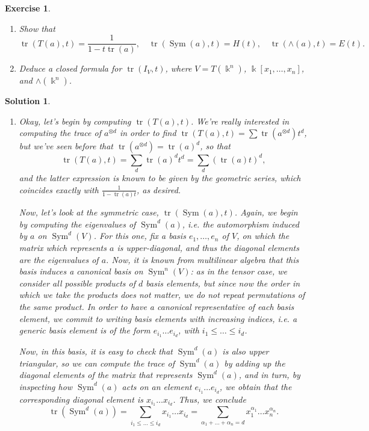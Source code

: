 \documentclass{article}
\newtheorem{ex}{Exercise}
\theoremstyle{nonumberplain}
\newtheorem{sol}{Solution}
\newcommand{\kk}{\Bbbk}
\DeclareMathOperator{\trace}{tr}
\DeclareMathOperator{\Sym}{Sym}
\begin{document}
\begin{ex}
\leavevmode
\begin{enumerate}
\item Show that
\begin{equation}
\trace(T(a), t) = \frac1{1- t \trace(a)}, \quad \trace(\Sym(a), t) = H(t), \quad \trace(\wedge(a), t) = E(t).
\end{equation}
\item Deduce a closed formula for $\trace( I_V, t)$, where $V = T(\kk^n)$, $\kk[x_1, \dots, x_n]$, and $\wedge(\kk^n)$.
\end{enumerate}
\end{ex}

\begin{sol}
\leavevmode
\begin{enumerate}
\item Okay, let's begin by computing $\trace(T(a),t)$. We're really interested in computing the trace of $a^{\otimes d}$ in order to find $\trace(T(a),t) = \sum \trace(a^{\otimes d}) t^d$, but we've seen before that $\trace(a^{\otimes d}) = \trace(a)^d$, so that
\begin{equation}
\trace(T(a), t) = \sum_d \trace(a)^d t^d = \sum_d (\trace(a) t)^d,
\end{equation}
and the latter expression is known to be given by the geometric series, which coincides exactly with $\frac1{1- \trace(a) t}$, as desired.

\smallskip

Now, let's look at the symmetric case, $\trace(\Sym(a), t)$. Again, we begin by computing the eigenvalues of $\Sym^d(a)$, i.e. the automorphism induced by $a$ on $\Sym^d(V)$. For this one, fix a basis $e_1, \dots, e_n$ of $V$, on which the matrix which represents $a$ is upper-diagonal, and thus the diagonal elements are the eigenvalues of $a$. Now, it is known from multilinear algebra that this basis induces a canonical basis on $\Sym^n(V)$: as in the tensor case, we consider all possible products of $d$ basis elements, but since now the order in which we take the products does not matter, we do not repeat permutations of the same product. In order to have a canonical representative of each basis element, we commit to writing basis elements with increasing indices, i.e. a generic basis element is of the form $e_{i_1} \dots e_{i_d}$, with $i_1 \leq \dots \leq i_d$.

Now, in this basis, it is easy to check that $\Sym^d(a)$ is also upper triangular, so we can compute the trace of $\Sym^d(a)$ by adding up the diagonal elements of the matrix that represents $\Sym^d(a)$, and in turn, by inspecting how $\Sym^d(a)$ acts on an element $e_{i_1} \dots e_{i_d}$, we obtain that the corresponding diagonal element is $x_{i_1} \dots x_{i_d}$. Thus, we conclude
\begin{equation}
\trace(\Sym^d(a)) = \sum_{i_1 \leq \dots \leq i_d} x_{i_1} \dots x_{i_d} = \sum_{\alpha_1 + \dots + \alpha_n = d} x_1^{\alpha_1} \dots x_n^{\alpha_n}.
\end{equation}


\end{enumerate}
\end{sol}
\end{document}
